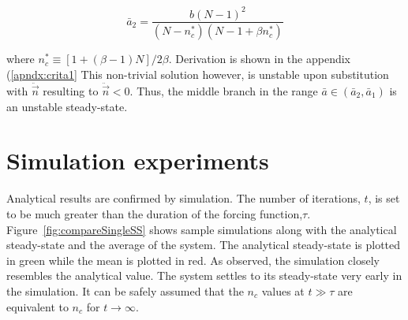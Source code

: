 \begin{equation}
\bar{a}_{2} = \frac{b(N-1)^{2}}{(N-n_{c}^{*})(N-1+\beta n_{c}^{*})}
\end{equation}

where $n_{c}^{*} \equiv [1+(\beta-1)N]/2\beta$.
Derivation is shown in the appendix (\ref{apndx:crita1}
This non-trivial solution however, is unstable upon substitution with $\ddot{\vec{n}}$ resulting to $\ddot{\vec{n}}<0$.
Thus, the middle branch in the range $\bar{a}\in(\bar{a}_{2},\bar{a}_{1})$ is an unstable steady-state.
 
\section{Simulation experiments}
\hspace{\parindent} Analytical results are confirmed by simulation. The number of iterations, $t$, is set to be much greater than the duration of the forcing function,$\tau$.
Figure~\ref{fig:compareSingleSS} shows sample simulations along with the analytical steady-state and the average of the system.
The analytical steady-state is plotted in green while the mean is plotted in red.
As observed, the simulation closely resembles the analytical value. The system settles to its steady-state very early in the simulation.
It can be safely assumed that the $n_{c}$ values at $t \gg \tau$ are equivalent to $n_{c}$ for $t \rightarrow \infty$.

